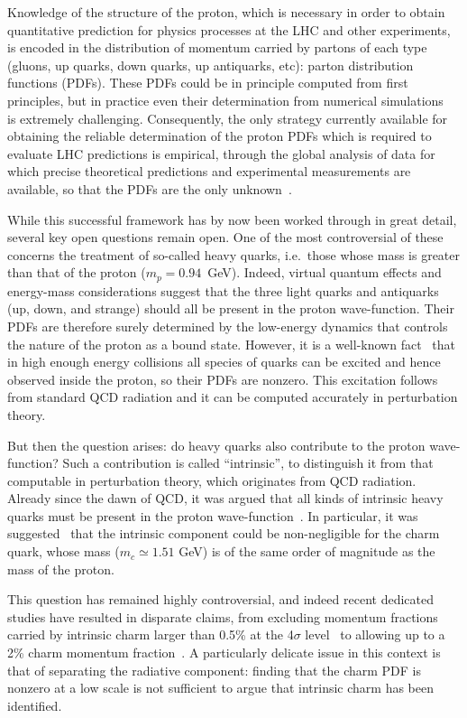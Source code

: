 Knowledge of the structure of the proton, which is necessary in order
to obtain
quantitative prediction for physics processes at the LHC and other
experiments, is encoded in
the distribution of  momentum carried by partons of each type
(gluons, up quarks, down quarks, up antiquarks, etc):
parton distribution functions (PDFs).
%
These PDFs could be in principle
computed from first principles, but in
practice even their determination from numerical
simulations~\cite{Constantinou:2020hdm} is extremely challenging.
%
Consequently,  the only 
strategy currently available for obtaining the
reliable determination of the proton PDFs which is required to evaluate LHC
predictions is empirical, through the global analysis of
data for which precise theoretical predictions and experimental
measurements are available, so that the PDFs are the only
unknown~\cite{Gao:2017yyd}.

While this successful framework has by now been worked through in great detail, several key open questions remain open.
%
One of the most controversial of these concerns the treatment of
so-called heavy quarks, i.e.\ those whose mass is greater than that of
the proton ($m_p=0.94$~GeV). Indeed, virtual quantum effects and
energy-mass considerations suggest that the three light quarks and
antiquarks (up, 
down, and strange) should all be present in the proton
wave-function.
%
Their PDFs are therefore surely determined by the low-energy
dynamics that controls the nature of the proton as a bound
state.
%
However, it is a well-known fact~\cite{DeRoeck:2011na,
  Kovarik:2019xvh,Gao:2017yyd,Rojo:2019uip}
that in high enough energy collisions all species of quarks can be
excited and hence observed
inside the proton, so their PDFs are nonzero.
%
This excitation
follows from standard QCD radiation and it can be computed accurately
in perturbation theory.

But then the question arises: do heavy quarks also contribute to the
proton wave-function? Such a contribution is called ``intrinsic'', to
distinguish it from that computable in
perturbation theory, which originates from QCD radiation.
%
Already since the dawn of QCD, it
was argued that all kinds of intrinsic heavy quarks must be
present in the
proton wave-function~\cite{Brodsky:1984nx}.
%
In particular, it was
suggested~\cite{Brodsky:1980pb}
that the intrinsic component could be non-negligible for the
charm quark, whose mass ($m_c\simeq 1.51$ GeV) is of the same order of
magnitude as the mass of the proton.

This question has remained highly controversial, and indeed recent
dedicated studies have resulted in disparate claims,
from excluding momentum fractions carried by intrinsic  charm larger than 0.5\% at the 4$\sigma$
level~\cite{Jimenez-Delgado:2014zga} to allowing up to a 2\% charm momentum
fraction~\cite{Hou:2017khm}.
%
A particularly delicate issue in this context is that of
separating the radiative component: finding that the charm PDF
is nonzero at a low scale is not sufficient to argue that intrinsic charm
has been identified.

